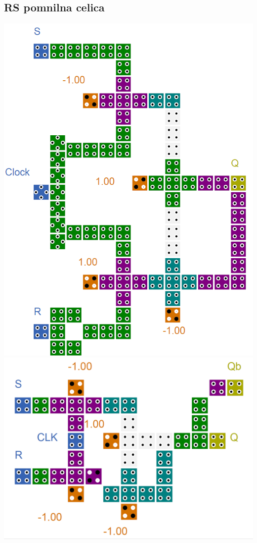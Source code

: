 \documentclass[a4paper, 11pt]{article}
\begin{document}
\subsection{RS pomnilna celica}
\includegraphics[scale=0.5]{../img/vir_4/sr.png} 
\includegraphics[scale=0.3]{../img/vir_5/rs.png} 
\end{document}
